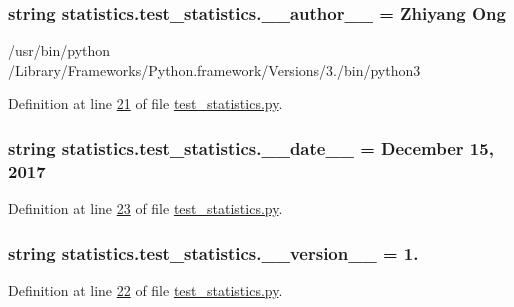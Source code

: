 \subsubsection[{\+\_\+\+\_\+author\+\_\+\+\_\+}]{\setlength{\rightskip}{0pt plus 5cm}string statistics.\+test\+\_\+statistics.\+\_\+\+\_\+author\+\_\+\+\_\+ = \textquotesingle{}Zhiyang Ong\textquotesingle{}}\label{namespacestatistics_1_1test__statistics_a188ace18635f13c413bf14347b4eb7f0}


/usr/bin/python /\+Library/\+Frameworks/\+Python.framework/\+Versions/3./bin/python3 



Definition at line \hyperlink{test__statistics_8py_source_l00021}{21} of file \hyperlink{test__statistics_8py_source}{test\+\_\+statistics.\+py}.

\hypertarget{namespacestatistics_1_1test__statistics_a271285b175d250f7888c9b41fa124abd}{}
\subsubsection[{\+\_\+\+\_\+date\+\_\+\+\_\+}]{\setlength{\rightskip}{0pt plus 5cm}string statistics.\+test\+\_\+statistics.\+\_\+\+\_\+date\+\_\+\+\_\+ = \textquotesingle{}December 15, 2017\textquotesingle{}}\label{namespacestatistics_1_1test__statistics_a271285b175d250f7888c9b41fa124abd}


Definition at line \hyperlink{test__statistics_8py_source_l00023}{23} of file \hyperlink{test__statistics_8py_source}{test\+\_\+statistics.\+py}.

\hypertarget{namespacestatistics_1_1test__statistics_ad5c236202b813efcbc877e38a20d7f07}{}
\subsubsection[{\+\_\+\+\_\+version\+\_\+\+\_\+}]{\setlength{\rightskip}{0pt plus 5cm}string statistics.\+test\+\_\+statistics.\+\_\+\+\_\+version\+\_\+\+\_\+ = \textquotesingle{}1.\textquotesingle{}}\label{namespacestatistics_1_1test__statistics_ad5c236202b813efcbc877e38a20d7f07}


Definition at line \hyperlink{test__statistics_8py_source_l00022}{22} of file \hyperlink{test__statistics_8py_source}{test\+\_\+statistics.\+py}.

